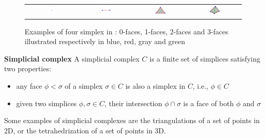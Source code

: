 \begin{figure}[t]
\centering
\begin{tabular}{cccc}
\includegraphics[width=0.15\textwidth]{./img/simplex01}&
\includegraphics[width=0.21\textwidth]{./img/simplex02}&
\includegraphics[width=0.21\textwidth]{./img/simplex03}&
\includegraphics[width=0.21\textwidth]{./img/simplex04}
\end{tabular}
\caption{Examples of four simplex in \Rthree: 0-faces, 1-faces, 2-faces and 3-faces illustrated respectively in blue, red, gray and green}
\label{fig:simplices}
\end{figure}


\begin{mydef}
\textbf{Simplicial complex}
A simplicial complex $C$ is a finite set of simplices satisfying two properties:
\begin{itemize}
  \item any face $\phi < \sigma$ of a simplex $\sigma \in C$ is also a simplex in $C$, i.e., $\phi \in C$
  \item given two simplices $\phi, \sigma \in C$, their intersection $\phi \cap \sigma$ is a face of both $\phi$ and $\sigma$
\end{itemize}
\end{mydef}
Some examples of simplicial complexes are the triangulations of a set of points in 2D, or the tetrahedrization of a set of points in 3D.

